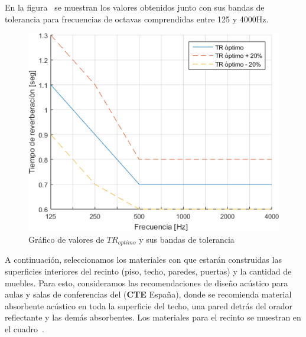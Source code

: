 \par En la figura~ se muestran los valores obtenidos junto con sus bandas de tolerancia para frecuencias de octavas comprendidas entre 125 y 4000Hz.


\begin{figure}[H]
	\centering
	\includegraphics[width=1\textwidth]{./img/TR_optimosYtolerancia.png}
	\caption{Gráfico de valores de $TR_{optimo}$ y sus bandas de tolerancia}
	\label{fig:TR_optimosYtolerancia}
\end{figure}

\par A continuación, seleccionamos los materiales con que estarán construidas las superficies interiores del recinto (piso, techo, paredes, puertas) y la cantidad de muebles. Para esto, consideramos las recomendaciones de diseño acústico para aulas y salas de conferencias del  (\textbf{CTE} España), donde se recomienda material absorbente acústico en toda la superficie del techo, una pared detrás del orador reflectante y las demás absorbentes. Los materiales para el recinto se muestran en el cuadro~.

\hfill

\clearpage

